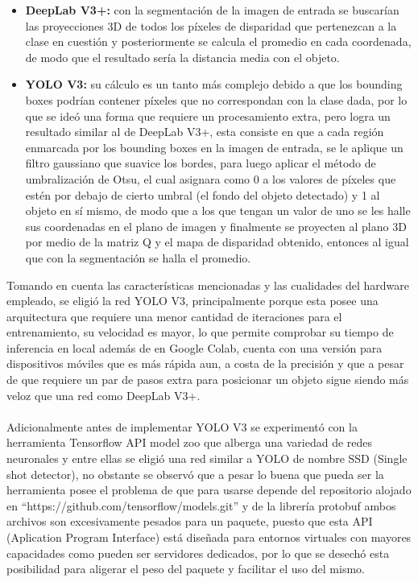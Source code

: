 \begin{itemize}
    \item \textbf{DeepLab V3+:} con la segmentación de la imagen de entrada se buscarían las proyecciones 3D de todos los píxeles de disparidad que pertenezcan a la clase en cuestión y posteriormente se calcula el promedio en cada coordenada, de modo que el resultado sería la distancia media con el objeto.
    \item \textbf{YOLO V3:} su cálculo es un tanto más complejo debido a que los bounding boxes podrían contener píxeles que no correspondan con la clase dada, por lo que se ideó una forma que requiere un procesamiento extra, pero logra un resultado similar al de DeepLab V3+, esta consiste en que a cada región enmarcada por los bounding boxes en la imagen de entrada, se le aplique un filtro gaussiano que suavice los bordes, para luego aplicar el método de umbralización de Otsu, el cual asignara como 0 a los valores de píxeles que estén por debajo de cierto umbral (el fondo del objeto detectado) y 1 al objeto en sí mismo, de modo que a los que tengan un valor de uno se les halle sus coordenadas en el plano de imagen y finalmente se proyecten al plano 3D por medio de la matriz Q y el mapa de disparidad obtenido, entonces al igual que con la segmentación se halla el promedio.
\end{itemize}
Tomando en cuenta las características mencionadas y las cualidades del hardware empleado, se eligió la red YOLO V3, principalmente porque esta posee una arquitectura que requiere una menor cantidad de iteraciones para el entrenamiento, su velocidad es mayor, lo que permite comprobar su tiempo de inferencia en local además de en Google Colab, cuenta con una versión para dispositivos móviles que es más rápida aun, a costa de la precisión y que a pesar de que requiere un par de pasos extra para posicionar un objeto sigue siendo más veloz que una red como DeepLab V3+.
\\
\\
Adicionalmente antes de implementar YOLO V3 se experimentó con la herramienta Tensorflow API model zoo que alberga una variedad de redes neuronales y entre ellas se eligió una red similar a YOLO de nombre SSD (Single shot detector), no obstante se observó que a pesar lo buena que pueda ser la herramienta posee el problema de que para usarse depende del repositorio alojado en ``https://github.com/tensorflow/models.git'' y de la librería protobuf ambos archivos son excesivamente pesados para un paquete, puesto que esta API (Aplication Program Interface) está diseñada para entornos virtuales con mayores capacidades como pueden ser servidores dedicados, por lo que se desechó esta posibilidad para aligerar el peso del paquete y facilitar el uso del mismo.
